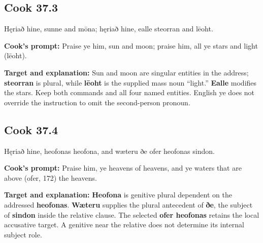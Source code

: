 \par\begin{minipage}{\linewidth}\raggedright
\subsection*{Cook 37.3}

Hęriað hine, sunne and mōna; hęriað hine, ealle steorran and lēoht.

\textbf{Cook's prompt:} Praise ye him, sun and moon; praise him, all ye stars and light (lēoht).

\textbf{Target and explanation:} Sun and moon are singular entities in the address; \textbf{steorran} is plural, while \textbf{lēoht} is the supplied mass noun “light.” \textbf{Ealle} modifies the stars. Keep both commands and all four named entities. English ye does not override the instruction to omit the second-person pronoun.

\end{minipage}\par\addvspace{4pt}

\par\begin{minipage}{\linewidth}\raggedright
\subsection*{Cook 37.4}

Hęriað hine, heofonas heofona, and wæteru ðe ofer heofonas sindon.

\textbf{Cook's prompt:} Praise him, ye heavens of heavens, and ye waters that are above (ofer, 172) the heavens.

\textbf{Target and explanation:} \textbf{Heofona} is genitive plural dependent on the addressed \textbf{heofonas}. \textbf{Wæteru} supplies the plural antecedent of \textbf{ðe}, the subject of \textbf{sindon} inside the relative clause. The selected \textbf{ofer heofonas} retains the local accusative target. A genitive near the relative does not determine its internal subject role.

\end{minipage}\par\addvspace{4pt}

